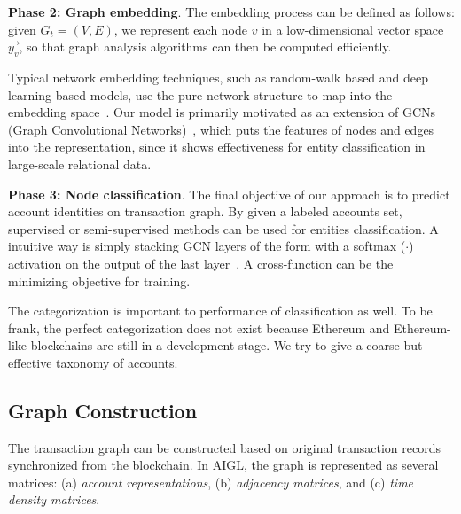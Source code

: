 \textbf{Phase 2: Graph embedding}.
The embedding process can be defined as follows: given $G_{t}=(V,E)$, we represent each node $v$ in a low-dimensional vector space $\vec{y_v}$, so that graph analysis algorithms can then be computed efficiently.

Typical network embedding techniques, such as random-walk based and deep learning based models, use the pure network structure to map into the embedding space~\cite{goyal2018capturing}. Our model is primarily motivated as an extension of GCNs (Graph Convolutional Networks)~\cite{kipf2016semi,schlichtkrull2018modeling}, which puts the features of nodes and edges into the representation, since it shows effectiveness for entity classification in large-scale relational data.


\textbf{Phase 3: Node classification}.
The final objective of our approach is to predict account identities on transaction graph. By given a labeled accounts set, supervised or semi-supervised methods can be used for entities classification. A intuitive way is simply stacking GCN layers of the form with a softmax ($\cdot$) activation on the output of the last layer~\cite{schlichtkrull2018modeling}. A cross-function can be the minimizing objective for training.

The categorization is important to performance of classification as well. To be frank, the perfect categorization does not exist because Ethereum and Ethereum-like blockchains are still in a development stage. We try to give a coarse but effective taxonomy of accounts.



\subsection{Graph Construction}
The transaction graph can be constructed based on original transaction records synchronized from the blockchain. In AIGL, the graph is represented as several matrices: (a) \emph{account representations}, (b) \emph{adjacency matrices}, and (c) \emph{time density matrices}.




